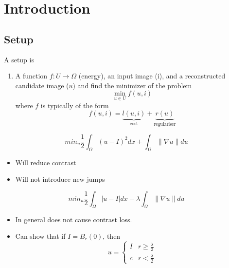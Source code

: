 
\chapter{Introduction}
\label{cha:introduction}

\section{Setup}
\label{sec:setup}

A setup is
\begin{enumerate}
\item A function $f: U \rightarrow \Omega$ (energy), an input image (i), and
  a reconstructed candidate image ($u$) and find the minimizer of the problem 
  \begin{equation}
    \label{eq:1}
    \min_{u \in U} f(u, i)
  \end{equation} where $f$ is typically of the form
  \begin{equation}
    \label{eq:2}
    f(u, i) = \underbrace{l(u, i)}_{\text{cost}} + \underbrace{r(u)}_{\text{regulariser}}
  \end{equation}
\end{enumerate}

\begin{exmp}
  \begin{equation}
    \label{eq:3}
    min_{u} \frac{1}{2} \int_{\Omega} (u - I)^{2} dx + \int_{\Omega}
    \| \nabla u \| du
  \end{equation}

  \begin{itemize}
  \item Will reduce contrast
  \item Will not introduce new jumps
  \end{itemize}
\end{exmp}

\begin{exmp}
  \begin{equation}
    \label{eq:4}
    min_{u} \frac{1}{2} \int_{\Omega} |u - I| dx + \lambda \int_{\Omega}
    \| \nabla u \| du
  \end{equation}
  \begin{itemize}
  \item In general does not cause contrast loss.
  \item Can show that if $I = B_{r}(0)$, then
    \begin{equation}
      u =
      \begin{cases}
        I & r \geq \frac{\lambda}{2} \\
        c & r < \frac{\lambda}{2}
      \end{cases}
    \end{equation}
  \end{itemize}
\end{exmp}



